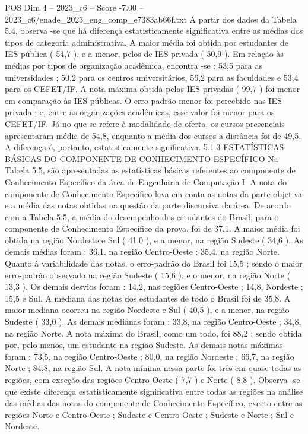\begin{textsample}{POS Dim 4 – 2023\_c6 – Score -7.00 – 2023\_c6/enade\_2023\_eng\_comp\_e7383ab66f.txt}
A partir dos dados da Tabela 5.4, observa -se que há diferença estatisticamente significativa entre as médias dos tipos de categoria administrativa.
A maior média foi obtida por estudantes de IES pública ( 54,7 ), e a menor, pelos de IES privada ( 50,9 ).
Em relação às médias por tipos de organização acadêmica, encontra -se : 53,5 para as universidades ; 50,2 para os centros universitários, 56,2 para as faculdades e 53,4 para os CEFET/IF.
A nota máxima obtida pelas IES privadas ( 99,7 ) foi menor em comparação às IES públicas.
O erro-padrão menor foi percebido nas IES privada ; e, entre as organizações acadêmicas, esse valor foi menor para os CEFET/IF.
Já no que se refere à modalidade de oferta, os cursos presenciais apresentaram média de 54,8, enquanto a média dos cursos a distância foi de 49,5.
A diferença é, portanto, estatisticamente significativa. 5.1.3 ESTATÍSTICAS BÁSICAS DO COMPONENTE DE CONHECIMENTO ESPECÍFICO Na Tabela 5.5, são apresentadas as estatísticas básicas referentes ao componente de Conhecimento Específico da área de Engenharia de Computação I.
A nota do componente de Conhecimento Específico leva em conta as notas da parte objetiva e a média das notas obtidas na questão da parte discursiva da área.
De acordo com a Tabela 5.5, a média do desempenho dos estudantes do Brasil, para o componente de Conhecimento Específico da prova, foi de 37,1.
A maior média foi obtida na região Nordeste e Sul ( 41,0 ), e a menor, na região Sudeste ( 34,6 ).
As demais médias foram : 36,1, na região Centro-Oeste ; 35,4, na região Norte.
Quanto à variabilidade das notas, o erro-padrão do Brasil foi 15,5 ; sendo o maior erro-padrão observado na região Sudeste ( 15,6 ), e o menor, na região Norte ( 13,3 ).
Os demais desvios foram : 14,2, nas regiões Centro-Oeste ; 14,8, Nordeste ; 15,5 e Sul.
A mediana das notas dos estudantes de todo o Brasil foi de 35,8.
A maior mediana ocorreu na região Nordeste e Sul ( 40,5 ), e a menor, na região Sudeste ( 33,0 ).
As demais medianas foram : 33,8, na região Centro-Oeste ; 34,8, na região Norte.
A nota máxima do Brasil, como um todo, foi 88,2 ; sendo obtida por, pelo menos, um estudante na região Sudeste.
As demais notas máximas foram : 73,5, na região Centro-Oeste ; 80,0, na região Nordeste ; 66,7, na região Norte ; 84,8, na região Sul.
A nota mínima nessa parte foi três em quase todas as regiões, com exceção das regiões Centro-Oeste ( 7,7 ) e Norte ( 8,8 ).
Observa -se que existe diferença estatisticamente significativa entre todas as regiões na análise das médias das notas do componente de Conhecimento Específico, exceto entre as regiões Norte e Centro-Oeste ; Sudeste e Centro-Oeste ; Sudeste e Norte ; Sul e Nordeste.

\end{textsample}
